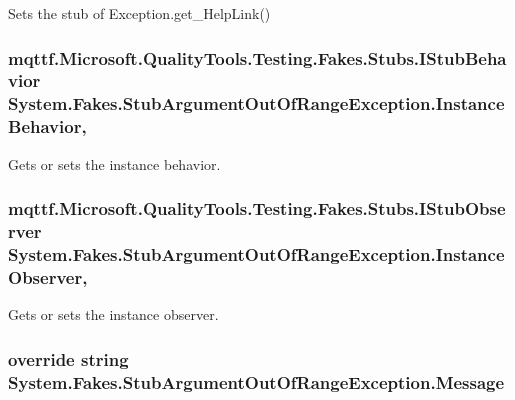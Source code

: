 Sets the stub of Exception.\-get\-\_\-\-Help\-Link()

\hypertarget{class_system_1_1_fakes_1_1_stub_argument_out_of_range_exception_ab3e5d615d76631f9b08814610016f99e}{
\subsubsection[{Instance\-Behavior}]{\setlength{\rightskip}{0pt plus 5cm}mqttf.\-Microsoft.\-Quality\-Tools.\-Testing.\-Fakes.\-Stubs.\-I\-Stub\-Behavior System.\-Fakes.\-Stub\-Argument\-Out\-Of\-Range\-Exception.\-Instance\-Behavior\hspace{0.3cm}{\ttfamily [get]}, {\ttfamily [set]}}}\label{class_system_1_1_fakes_1_1_stub_argument_out_of_range_exception_ab3e5d615d76631f9b08814610016f99e}


Gets or sets the instance behavior.

\hypertarget{class_system_1_1_fakes_1_1_stub_argument_out_of_range_exception_affef8a9f3e57ef56b1989518f21efacc}{
\subsubsection[{Instance\-Observer}]{\setlength{\rightskip}{0pt plus 5cm}mqttf.\-Microsoft.\-Quality\-Tools.\-Testing.\-Fakes.\-Stubs.\-I\-Stub\-Observer System.\-Fakes.\-Stub\-Argument\-Out\-Of\-Range\-Exception.\-Instance\-Observer\hspace{0.3cm}{\ttfamily [get]}, {\ttfamily [set]}}}\label{class_system_1_1_fakes_1_1_stub_argument_out_of_range_exception_affef8a9f3e57ef56b1989518f21efacc}


Gets or sets the instance observer.

\hypertarget{class_system_1_1_fakes_1_1_stub_argument_out_of_range_exception_a7901710a086693bf857e456c86c2b481}{
\subsubsection[{Message}]{\setlength{\rightskip}{0pt plus 5cm}override string System.\-Fakes.\-Stub\-Argument\-Out\-Of\-Range\-Exception.\-Message\hspace{0.3cm}{\ttfamily [get]}}}\label{class_system_1_1_fakes_1_1_stub_argument_out_of_range_exception_a7901710a086693bf857e456c86c2b481}


